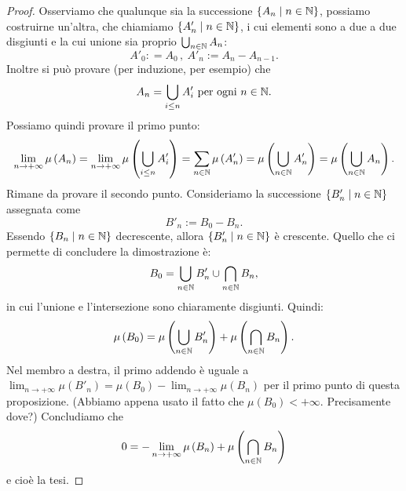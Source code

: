\begin{proof}
Osserviamo che qualunque sia la successione \(\left\{A_n \mid n \in \mathbb N\right\}\), possiamo costruirne un'altra, che chiamiamo \(\left\{A'_n \mid n \in \mathbb N\right\}\), i cui elementi sono a due a due disgiunti e la cui unione sia proprio \(\bigcup_{n \in \mathbb N} A_n\):
\[A'_0 : = A_0\,, \ A'_n := A_{n} - A_{n-1}.\]
Inoltre si può provare (per induzione, per esempio) che
\[A_n = \bigcup_{i \le n} A'_i \text{ per ogni } n \in \mathbb N .\]
Possiamo quindi provare il primo punto:
\[
\lim_{n \to +\infty} \mu \left( A_n \right) = \lim_{n \to +\infty} \mu\left( \bigcup_{i \le n} A'_i \right) = \sum_{n \in \mathbb N} \mu \left( A'_n \right) = \mu \left( \bigcup_{n \in \mathbb N} A'_n \right) = \mu \left( \bigcup_{n \in \mathbb N} A_n \right).\]
Rimane da provare il secondo punto. Consideriamo la successione \(\left\{B'_n \mid n \in \mathbb N\right\}\) assegnata come
\[B'_n := B_0 - B_n .\]
Essendo \(\left\{B_n \mid n \in \mathbb N\right\}\) decrescente, allora \(\left\{B'_n \mid n \in \mathbb N\right\}\) è crescente. Quello che ci permette di concludere la dimostrazione è:
\[B_0 = \bigcup_{n \in \mathbb N} B'_n \cup \bigcap_{n \in \mathbb N} B_n ,\]
in cui l'unione e l'intersezione sono chiaramente disgiunti. Quindi:
\[\mu \left( B_0 \right) = \mu \left( \bigcup_{n \in \mathbb N} B'_n \right) + \mu \left( \bigcap_{n \in \mathbb N} B_n \right).\]
Nel membro a destra, il primo addendo è uguale a \(\lim_{n \to +\infty} \mu \left( B'_n \right) = \mu \left(B_0\right) - \lim_{n \to +\infty} \mu\left(B_n\right)\) per il primo punto di questa proposizione. (Abbiamo appena usato il fatto che \(\mu\left(B_0\right) < +\infty\). Precisamente dove?) Concludiamo che
\[0 = - \lim_{n \to +\infty} \mu\left(B_n\right) + \mu \left( \bigcap_{n \in \mathbb N} B_n \right)\]
e cioè la tesi.
\end{proof}
